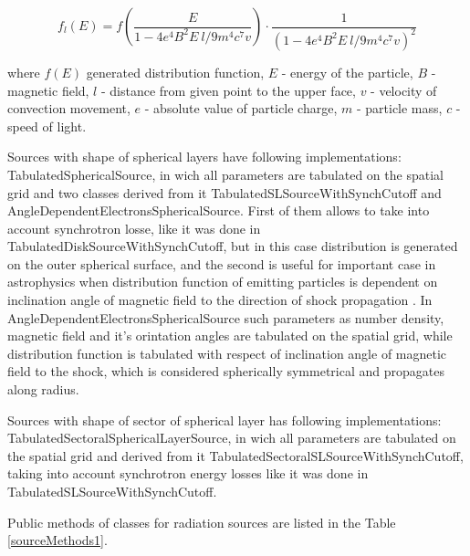 \begin{equation}
	f_l(E)=f\left(\frac{E}{1-4e^4 B^2 E~l/9m^4 c^7 v}\right)\cdot\frac{1}{\left(1-4e^4 B^2 E~l/9m^4 c^7 v\right)^2}
\end{equation}

where $f(E)$ generated distribution function, $E$ - energy of the particle, $B$ - magnetic field, $l$ - distance from given point to the upper face, $v$ - velocity of convection movement, $e$ - absolute value of particle charge, $m$ - particle mass, $c$ - speed of light.

Sources with shape of spherical layers have following implementations: TabulatedSphericalSource, in wich all parameters are tabulated on the spatial grid and two classes derived from it  TabulatedSLSourceWithSynchCutoff and AngleDependentElectronsSphericalSource. First of them allows to take into account synchrotron losse, like it was done in TabulatedDiskSourceWithSynchCutoff, but in this case distribution is generated on the outer spherical surface, and the second is useful for important case in astrophysics when distribution function of emitting particles is dependent on inclination angle of magnetic field to the direction of shock propagation \cite{SironiSpitkovsky2009pair, GuoSironi2014_1,Crumley2019, Romansky2018}. In AngleDependentElectronsSphericalSource such parameters as number density, magnetic field and it's orintation angles are tabulated on the spatial grid, while distribution function is tabulated with respect of inclination angle of magnetic field to the shock, which is considered spherically symmetrical and propagates along radius.

Sources with shape of sector of spherical layer has following implementations: TabulatedSectoralSphericalLayerSource, in wich all parameters are tabulated on the spatial grid and derived from it TabulatedSectoralSLSourceWithSynchCutoff, taking into account synchrotron energy losses like it was done in TabulatedSLSourceWithSynchCutoff.

Public methods of classes for radiation sources are listed in the Table \ref{sourceMethods1}.

